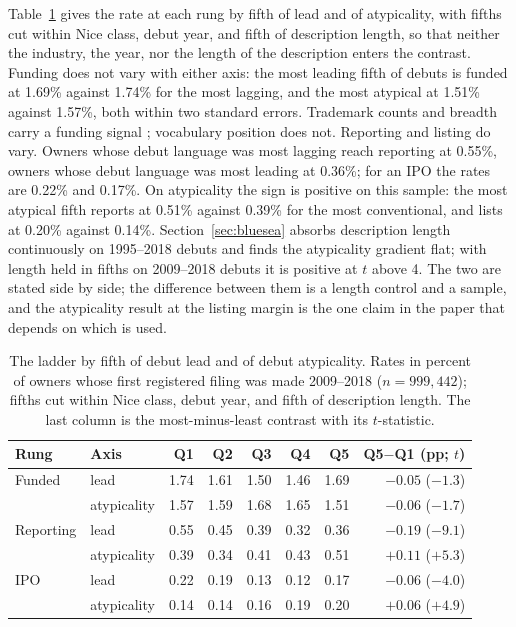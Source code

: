Table~\ref{tab:ladder} gives the rate at each rung by fifth of lead and of
atypicality, with fifths cut within Nice class, debut year, and fifth of
description length, so that neither the industry, the year, nor the length
of the description enters the contrast. Funding does not vary with either
axis: the most leading fifth of debuts is funded at 1.69\% against 1.74\%
for the most lagging, and the most atypical at 1.51\% against 1.57\%, both
within two standard errors. Trademark counts and breadth carry a funding signal
\citep{Block2014}; vocabulary position does not. Reporting and listing do
vary. Owners whose debut language was most lagging reach reporting at
0.55\%, owners whose debut language was most leading at 0.36\%; for an IPO
the rates are 0.22\% and 0.17\%. On atypicality the sign is positive on
this sample: the most atypical fifth reports at 0.51\% against 0.39\% for
the most conventional, and lists at 0.20\% against 0.14\%.
Section~\ref{sec:bluesea} absorbs description length continuously on
1995--2018 debuts and finds the atypicality gradient flat; with length
held in fifths on 2009--2018 debuts it is positive at $t$ above 4. The two
are stated side by side; the difference between them is a length control
and a sample, and the atypicality result at the listing margin is the one
claim in the paper that depends on which is used.

\begin{table}[h]\centering\small
\caption{The ladder by fifth of debut lead and of debut atypicality. Rates
in percent of owners whose first registered filing was made 2009--2018
($n = 999{,}442$); fifths cut within Nice class, debut year, and fifth of
description length. The last column is the most-minus-least contrast with
its $t$-statistic.}
\label{tab:ladder}
\begin{tabular}{llrrrrrr}
\toprule
Rung & Axis & Q1 & Q2 & Q3 & Q4 & Q5 & Q5$-$Q1 (pp; $t$) \\
\midrule
Funded    & lead         & 1.74 & 1.61 & 1.50 & 1.46 & 1.69 & $-0.05$ ($-1.3$) \\
          & atypicality  & 1.57 & 1.59 & 1.68 & 1.65 & 1.51 & $-0.06$ ($-1.7$) \\
Reporting & lead         & 0.55 & 0.45 & 0.39 & 0.32 & 0.36 & $-0.19$ ($-9.1$) \\
          & atypicality  & 0.39 & 0.34 & 0.41 & 0.43 & 0.51 & $+0.11$ ($+5.3$) \\
IPO       & lead         & 0.22 & 0.19 & 0.13 & 0.12 & 0.17 & $-0.06$ ($-4.0$) \\
          & atypicality  & 0.14 & 0.14 & 0.16 & 0.19 & 0.20 & $+0.06$ ($+4.9$) \\
\bottomrule
\end{tabular}
\end{table}

